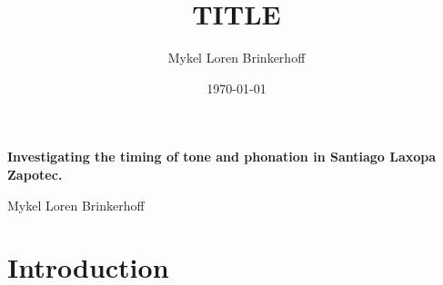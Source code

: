 \documentclass[12pt, letterpaper]{article}
\title{TITLE}
\author{Mykel Loren Brinkerhoff}
\date{\today}
\begin{document}
	
	
	
\begin{center}
	{\Large \textbf{Investigating the timing of tone and phonation in Santiago Laxopa Zapotec. }}
	\vspace{6pt}

	Mykel Loren Brinkerhoff
\end{center}
\thispagestyle{fancy}

\tableofcontents


\section{Introduction} \label{sec:Introduction}
\end{document}

